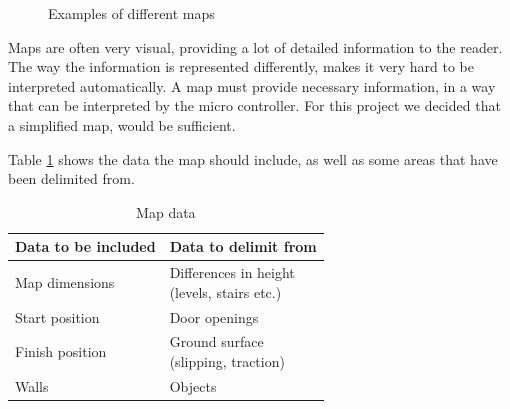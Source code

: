 \begin{figure}[h!tp]
    \centering
    \hspace{0.1\textwidth}
    \caption{Examples of different maps}
    \label{fig:floor_plans}
\end{figure}

Maps are often very visual, providing a lot of detailed information to the reader.
The way the information is represented differently,
makes it very hard to be interpreted automatically.
A map must provide necessary information,
in a way that can be interpreted by the micro controller.
For this project we decided that a simplified map, would be sufficient.

Table \ref{table:map_data} shows the data the map should include,
as well as some areas that have been delimited from.

\begin{table}[h!]
	\centering
	\caption{Map data}
	\begin{tabular}{|p{}||p{}|}
		\hline
		Data to be included & Data to delimit from \\ 
		\hline
		Map dimensions 		& \parbox[t]{0.4\textwidth}{Differences in height\\(levels, stairs etc.)}\\
		\hline
		Start position 		& Door openings \\
		\hline
		Finish position 	& \parbox[t]{0.4\textwidth}{Ground surface\\(slipping, traction)} \\
		\hline
		Walls 				& Objects\\
		\hline
	\end{tabular}
	\label{table:map_data}
\end{table}


